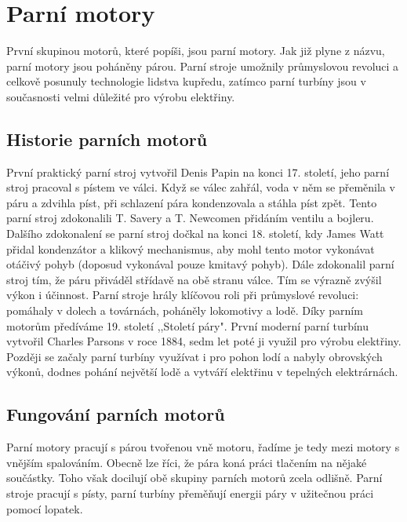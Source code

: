 \section{Parní motory}
{První skupinou motorů, které popíši, jsou parní motory. Jak již plyne z názvu, parní motory jsou poháněny párou. Parní stroje umožnily průmyslovou revoluci a celkově posunuly technologie lidstva kupředu, zatímco parní turbíny jsou v současnosti velmi důležité pro výrobu elektřiny.}

\subsection{Historie parních motorů}
{První praktický parní stroj vytvořil Denis Papin na konci 17. století, jeho parní stroj pracoval s pístem ve válci. Když se válec zahřál, voda v něm se přeměnila v páru a zdvihla píst, při schlazení pára kondenzovala a stáhla píst zpět. Tento parní stroj zdokonalili T. Savery a T. Newcomen přidáním ventilu a bojleru. Dalšího zdokonalení se parní stroj dočkal na konci 18. století, kdy James Watt přidal kondenzátor a klikový mechanismus, aby mohl tento motor vykonávat otáčivý pohyb (doposud vykonával pouze kmitavý pohyb). Dále zdokonalil parní stroj tím, že páru přiváděl střídavě na obě stranu válce. Tím se výrazně zvýšil výkon i účinnost. Parní stroje hrály klíčovou roli při průmyslové revoluci: pomáhaly v dolech a továrnách, poháněly lokomotivy a lodě. Díky parním motorům předíváme 19. století ,,Století páry".}
\cite{st:parniStroj}\odst
{První moderní parní turbínu vytvořil Charles Parsons v roce 1884, sedm let poté ji využil pro výrobu elektřiny. Později se začaly parní turbíny využívat i pro pohon lodí a nabyly obrovských výkonů, dodnes pohání největší lodě a vytváří elektřinu v tepelných elektrárnách.}
\cite{SA:SteamTurbines}

\subsection{Fungování parních motorů}
{Parní motory pracují s párou tvořenou vně motoru, řadíme je tedy mezi motory s vnějším spalováním. Obecně lze říci, že pára koná práci tlačením na nějaké součástky. Toho však docilují obě skupiny parních motorů zcela odlišně. Parní stroje pracují s písty, parní turbíny přeměňují energii páry v užitečnou práci pomocí lopatek.}

